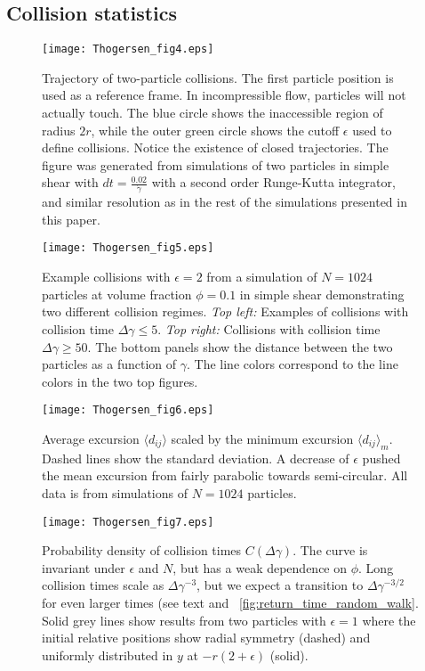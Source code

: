 \documentclass[aps,pre,twocolumn,letterpaper,floatfix,showpacs]{revtex4}
\begin{document}
\subsection{Collision statistics}
\begin{figure}
\texttt{[image: Thogersen\_fig4.eps]}
\caption{Trajectory of two-particle collisions. The first particle position is used as a reference frame. In incompressible flow, particles will not actually touch. The blue circle shows the inaccessible region of radius $2r$, while the outer green circle shows the cutoff $\epsilon$ used to define collisions. Notice the existence of closed trajectories. The figure was generated from simulations of two particles in simple shear with $dt = \frac{0.02}{\dot \gamma}$ with a second order Runge-Kutta integrator, and similar resolution as in the rest of the simulations presented in this paper.
\label{fig:two_particle_interaction}}
\end{figure}
\begin{figure*}[p]
\texttt{[image: Thogersen\_fig5.eps]}
\caption{Example collisions with $\epsilon = 2$ from a simulation of $N=1024$ particles at volume fraction $\phi = 0.1$ in simple shear demonstrating two different collision regimes. \emph{Top left:} Examples of collisions with collision time $\Delta \gamma \leq 5$. \emph{Top right:} Collisions with collision time $\Delta \gamma \geq 50$. The bottom panels show the distance between the two particles as a function of $\gamma$. The line colors correspond to the line colors in the two top figures.
\label{fig:excursion_examples}}
\end{figure*}
\begin{figure*}
\begin{minipage}[t]{.49\textwidth}
\texttt{[image: Thogersen\_fig6.eps]}
\caption{Average excursion $\langle d_{ij} \rangle$ scaled by the minimum excursion $\langle d_{ij} \rangle_m$. Dashed lines show the standard deviation. A decrease of $\epsilon$ pushed the mean excursion from fairly parabolic towards semi-circular. All data is from simulations of $N = 1024$ particles.
\label{fig:mean_excursion}}
\end{minipage}
\hfill \hfill
\begin{minipage}[t]{.49\textwidth}
\texttt{[image: Thogersen\_fig7.eps]}
\caption{Probability density of collision times $C(\Delta \gamma)$. The curve is invariant under $\epsilon$ and $N$, but has a weak dependence on $\phi$. Long collision times scale as $\Delta \gamma ^{-3}$, but we expect a transition to $\Delta \gamma ^{-3/2}$ for even larger times (see text and \figurename~\ref{fig:return_time_random_walk}. Solid grey lines show results from two particles with $\epsilon = 1$ where the initial relative positions show radial symmetry (dashed) and uniformly distributed in $y$ at $-r(2+\epsilon)$ (solid).
\label{fig:contact_time_distribution}}
\end{minipage}
\end{figure*}
\end{document}
